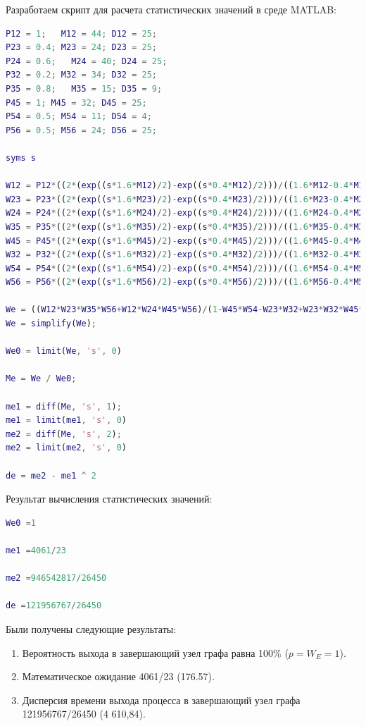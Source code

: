 \documentclass[14pt,a4paper,report]{report}
\begin{document}
Разработаем скрипт для расчета статистических значений в среде MATLAB:
\begin{lstlisting}[language={matlab}, caption={Matlab скрипт}, basicstyle=\ttfamily]
P12 = 1;   M12 = 44; D12 = 25;
P23 = 0.4; M23 = 24; D23 = 25;
P24 = 0.6;   M24 = 40; D24 = 25;
P32 = 0.2; M32 = 34; D32 = 25;
P35 = 0.8;   M35 = 15; D35 = 9;
P45 = 1; M45 = 32; D45 = 25;
P54 = 0.5; M54 = 11; D54 = 4;
P56 = 0.5; M56 = 24; D56 = 25;

syms s

W12 = P12*((2*(exp((s*1.6*M12)/2)-exp((s*0.4*M12)/2)))/((1.6*M12-0.4*M12)*s))^2;
W23 = P23*((2*(exp((s*1.6*M23)/2)-exp((s*0.4*M23)/2)))/((1.6*M23-0.4*M23)*s))^2;
W24 = P24*((2*(exp((s*1.6*M24)/2)-exp((s*0.4*M24)/2)))/((1.6*M24-0.4*M24)*s))^2;
W35 = P35*((2*(exp((s*1.6*M35)/2)-exp((s*0.4*M35)/2)))/((1.6*M35-0.4*M35)*s))^2;
W45 = P45*((2*(exp((s*1.6*M45)/2)-exp((s*0.4*M45)/2)))/((1.6*M45-0.4*M45)*s))^2;
W32 = P32*((2*(exp((s*1.6*M32)/2)-exp((s*0.4*M32)/2)))/((1.6*M32-0.4*M32)*s))^2;
W54 = P54*((2*(exp((s*1.6*M54)/2)-exp((s*0.4*M54)/2)))/((1.6*M54-0.4*M54)*s))^2;
W56 = P56*((2*(exp((s*1.6*M56)/2)-exp((s*0.4*M56)/2)))/((1.6*M56-0.4*M56)*s))^2;

We = ((W12*W23*W35*W56+W12*W24*W45*W56)/(1-W45*W54-W23*W32+W23*W32*W45*W54));
We = simplify(We);

We0 = limit(We, 's', 0)

Me = We / We0;

me1 = diff(Me, 's', 1);
me1 = limit(me1, 's', 0)
me2 = diff(Me, 's', 2);
me2 = limit(me2, 's', 0)

de = me2 - me1 ^ 2
\end{lstlisting}


Результат вычисления статистических значений:

\begin{lstlisting}[language={matlab}, caption={Matlab скрипт}, basicstyle=\ttfamily]
We0 =1
 
me1 =4061/23 
 
me2 =946542817/26450 
 
de =121956767/26450
\end{lstlisting}

Были получены следующие результаты:
\begin{enumerate}
\item Вероятность выхода в завершающий узел графа равна 100\% ($p=W_E=1$).
\item Математическое ожидание 4061/23 (176.57).
\item Дисперсия времени выхода процесса в завершающий узел графа 121956767/26450 (4 610,84).
\end{enumerate}
\end{document}
